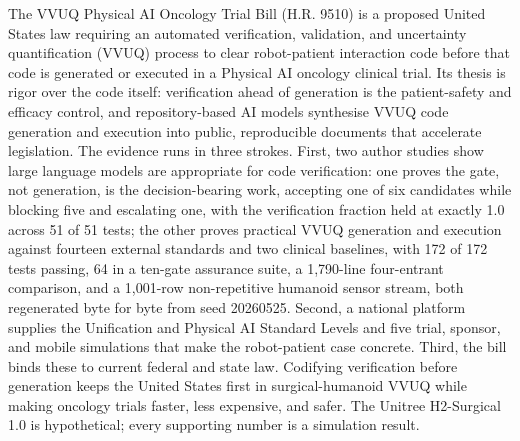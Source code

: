 
The VVUQ Physical AI Oncology Trial Bill (H.R. 9510) is a proposed United States
law requiring an automated verification, validation, and uncertainty
quantification (VVUQ) process to clear robot-patient interaction code before that
code is generated or executed in a Physical AI oncology clinical trial. Its
thesis is rigor over the code itself: verification ahead of generation is the
patient-safety and efficacy control, and repository-based AI models synthesise
VVUQ code generation and execution into public, reproducible documents that
accelerate legislation. The evidence runs in three strokes. First, two author
studies show large language models are appropriate for code verification: one
proves the gate, not generation, is the decision-bearing work, accepting one of
six candidates while blocking five and escalating one, with the verification
fraction held at exactly 1.0 across 51 of 51 tests; the other proves practical
VVUQ generation and execution against fourteen external standards and two
clinical baselines, with 172 of 172 tests passing, 64 in a ten-gate assurance
suite, a 1{,}790-line four-entrant comparison, and a 1{,}001-row non-repetitive
humanoid sensor stream, both regenerated byte for byte from seed 20260525.
Second, a national platform supplies the Unification and Physical AI Standard
Levels and five trial, sponsor, and mobile simulations that make the
robot-patient case concrete. Third, the bill binds these to current federal and
state law. Codifying verification before generation keeps the United States first
in surgical-humanoid VVUQ while making oncology trials faster, less expensive,
and safer. The Unitree H2-Surgical 1.0 is hypothetical; every supporting number
is a simulation result.
